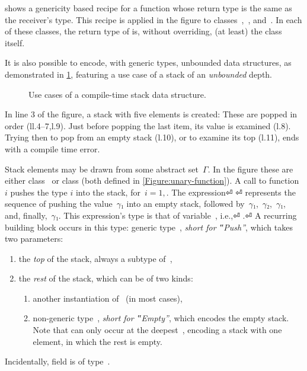  shows a genericity based recipe for
  a function whose return type
  is the same as the receiver's type.
  This recipe is applied in the figure to classes~,~, and~.
  In each of these classes, the return type of  is,
  without overriding, (at least) the class itself.

It is also possible to encode, with \Java generic types,
  unbounded data structures, 
  as demonstrated in \cref{Figure:stack-use-cases},
  featuring a use case of a stack of an \emph{unbounded} depth.

\begin{figure}[htp]
  \caption{\label{Figure:stack-use-cases}%
    Use cases of a compile-time stack data structure.
  }
\end{figure}

In line 3 of the figure, a stack with five elements is created:
These are popped in order (ll.4--7,l.9).
Just before popping the last item, its value is examined (l.8).
Trying then to pop from an empty stack (l.10), or to examine its top (l.11), ends with
  a compile time error.

Stack elements may be drawn from some abstract set~$Γ$.
In the figure these are either class~
or class  (both defined in \cref{Figure:unary-function}).
A call to function $i$ pushes the type $i$
  into the stack, for~$i=1,$.
The expression⏎
  \mbox{\qquad\qquad} ⏎
represents the sequence of pushing the value~$γ₁$ into an
empty stack, followed by~$γ₁$,~$γ₂$,~$γ₁$, and, finally,~$γ₁$.
This expression's type is that of variable~, i.e.,⏎
\mbox{\qquad\qquad} .⏎
A recurring building block occurs in this type: 
  generic type~, \emph{short for ‟Push”}, which takes two parameters:
  \begin{enumerate}
    \item the \emph{top} of the stack, always a subtype of~,
    \item the \emph{rest} of the stack, which can be of two kinds:
          \begin{enumerate}
            \item another instantiation of~ (in most cases),
            \item non-generic type~, \emph{short for ‟Empty”}, which encodes the empty
              stack. Note that  can only occur at the deepest~, encoding a stack 
              with one element, in which the rest is empty. 
          \end{enumerate}
  \end{enumerate}
Incidentally,  field  is of type~.

